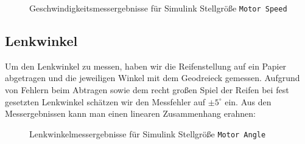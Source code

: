 \begin{figure}[h]
\centering

\caption[Motor Speed]{Geschwindigkeitsmessergebnisse für Simulink Stellgröße \texttt{Motor Speed}}
\label{fig:motor_speed}
\end{figure}

\subsection{Lenkwinkel}

Um den Lenkwinkel zu messen, haben wir die Reifenstellung auf ein Papier abgetragen und die jeweiligen Winkel mit dem Geodreieck gemessen. Aufgrund von Fehlern beim Abtragen sowie dem recht großen Spiel der Reifen bei fest gesetzten Lenkwinkel schätzen wir den Messfehler auf $\pm5^\circ$ ein. Aus den Messergebnissen kann man einen linearen Zusammenhang erahnen:

\begin{figure}[h]
\centering

\caption[Motor Angle]{Lenkwinkelmessergebnisse für Simulink Stellgröße \texttt{Motor Angle}}
\label{fig:motor_angle}
\end{figure}

